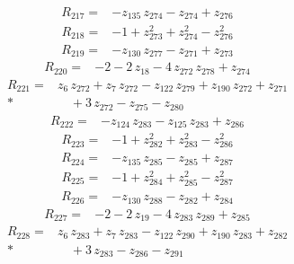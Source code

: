 \documentclass[10pt]{article}
\begin{document}
\begin{align*}
R_{217}={}& - z_{135}\,z_{274} - z_{274} + z_{276}
\end{align*}
\begin{align*}
R_{218}={}& - 1 + z_{273}^{2} + z_{274}^{2} - z_{276}^{2}
\end{align*}
\begin{align*}
R_{219}={}& - z_{130}\,z_{277} - z_{271} + z_{273}
\end{align*}
\begin{align*}
R_{220}={}& - 2 - 2\,z_{18} - 4\,z_{272}\,z_{278} + z_{274}
\end{align*}
\begin{align*}
R_{221}={}& z_{6}\,z_{272} + z_{7}\,z_{272} - z_{122}\,z_{279} + z_{190}\,z_{272} + z_{271} \\*
&\quad + 3\,z_{272} - z_{275} - z_{280}
\end{align*}
\begin{align*}
R_{222}={}& - z_{124}\,z_{283} - z_{125}\,z_{283} + z_{286}
\end{align*}
\begin{align*}
R_{223}={}& - 1 + z_{282}^{2} + z_{283}^{2} - z_{286}^{2}
\end{align*}
\begin{align*}
R_{224}={}& - z_{135}\,z_{285} - z_{285} + z_{287}
\end{align*}
\begin{align*}
R_{225}={}& - 1 + z_{284}^{2} + z_{285}^{2} - z_{287}^{2}
\end{align*}
\begin{align*}
R_{226}={}& - z_{130}\,z_{288} - z_{282} + z_{284}
\end{align*}
\begin{align*}
R_{227}={}& - 2 - 2\,z_{19} - 4\,z_{283}\,z_{289} + z_{285}
\end{align*}
\begin{align*}
R_{228}={}& z_{6}\,z_{283} + z_{7}\,z_{283} - z_{122}\,z_{290} + z_{190}\,z_{283} + z_{282} \\*
&\quad + 3\,z_{283} - z_{286} - z_{291}
\end{align*}
\end{document}

